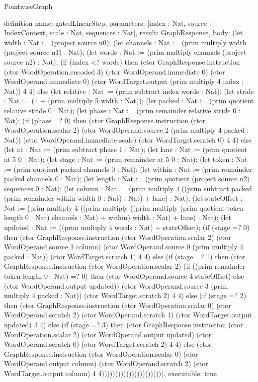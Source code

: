 \begin{lexlean}{PointwiseGraph}
\begin{semanticmodule}
definition{
  name: gatedLinearStep,
  parameters: [index : Nat, source : IndexContext, scale : Nat, sequences : Nat],
  result: GraphResponse,
  body: (let width : Nat := (project source u0);
      (let channels : Nat := (prim multiply width (project source n1) : Nat);
      (let words : Nat := (prim multiply channels (project source n2) : Nat);
      (if (index <? words) then (ctor GraphResponse.instruction (ctor WordOperation.encoded 3) (ctor WordOperand.immediate 0) (ctor WordOperand.immediate 0) (ctor WordTarget.output (prim multiply 4 index : Nat)) 4 4) else (let relative : Nat := (prim subtract index words : Nat);
      (let stride : Nat := (1 + (prim multiply 5 width : Nat));
      (let packed : Nat := (prim quotient relative stride 0 : Nat);
      (let phase : Nat := (prim remainder relative stride 0 : Nat);
      (if (phase =? 0) then (ctor GraphResponse.instruction (ctor WordOperation.scalar 2) (ctor WordOperand.source 2 (prim multiply 4 packed : Nat)) (ctor WordOperand.immediate scale) (ctor WordTarget.scratch 0) 4 4) else (let at : Nat := (prim subtract phase 1 : Nat);
      (let lane : Nat := (prim quotient at 5 0 : Nat);
      (let stage : Nat := (prim remainder at 5 0 : Nat);
      (let token : Nat := (prim quotient packed channels 0 : Nat);
      (let within : Nat := (prim remainder packed channels 0 : Nat);
      (let length : Nat := (prim quotient (project source n2) sequences 0 : Nat);
      (let column : Nat := (prim multiply 4 ((prim subtract packed (prim remainder within width 0 : Nat) : Nat) + lane) : Nat);
      (let stateOffset : Nat := (prim multiply 4 ((prim multiply ((prim multiply (prim quotient token length 0 : Nat) channels : Nat) + within) width : Nat) + lane) : Nat);
      (let updated : Nat := ((prim multiply 4 words : Nat) + stateOffset);
      (if (stage =? 0) then (ctor GraphResponse.instruction (ctor WordOperation.scalar 2) (ctor WordOperand.source 1 column) (ctor WordOperand.source 0 (prim multiply 4 packed : Nat)) (ctor WordTarget.scratch 1) 4 4) else (if (stage =? 1) then (ctor GraphResponse.instruction (ctor WordOperation.scalar 2) (if ((prim remainder token length 0 : Nat) =? 0) then (ctor WordOperand.source 4 stateOffset) else (ctor WordOperand.output updated)) (ctor WordOperand.source 3 (prim multiply 4 packed : Nat)) (ctor WordTarget.scratch 2) 4 4) else (if (stage =? 2) then (ctor GraphResponse.instruction (ctor WordOperation.scalar 0) (ctor WordOperand.scratch 2) (ctor WordOperand.scratch 1) (ctor WordTarget.output updated) 4 4) else (if (stage =? 3) then (ctor GraphResponse.instruction (ctor WordOperation.scalar 2) (ctor WordOperand.output updated) (ctor WordOperand.scratch 0) (ctor WordTarget.scratch 2) 4 4) else (ctor GraphResponse.instruction (ctor WordOperation.scalar 0) (ctor WordOperand.output column) (ctor WordOperand.scratch 2) (ctor WordTarget.output column) 4 4))))))))))))))))))))))),
  executable: true
}


\end{semanticmodule}
\end{lexlean}
